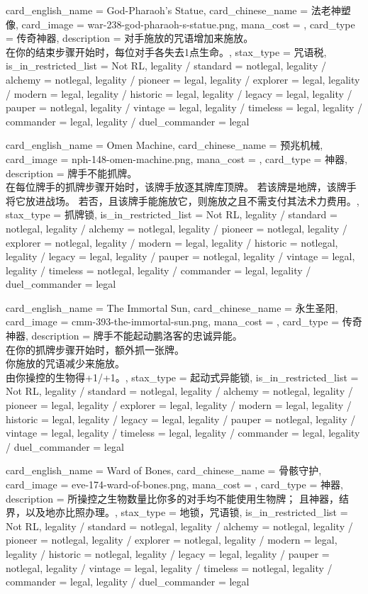 \documentclass[lang = cn, color = black, 10pt]{AllThatStax}
\begin{document}
\card
{
	card_english_name = {God-Pharaoh's Statue},
	card_chinese_name = {法老神塑像},
	card_image = war-238-god-pharaoh-s-statue.png,
	mana_cost = ,
	card_type = 传奇神器,
	description = {对手施放的咒语增加来施放。\\
在你的结束步骤开始时，每位对手各失去1点生命。},
	stax_type = 咒语税,
	is_in_restricted_list = Not RL,
	legality / standard = notlegal,
	legality / alchemy = notlegal,
	legality / pioneer = legal,
	legality / explorer = legal,
	legality / modern = legal,
	legality / historic = legal,
	legality / legacy = legal,
	legality / pauper = notlegal,
	legality / vintage = legal,
	legality / timeless = legal,
	legality / commander = legal,
	legality / duel_commander = legal
}

\card
{
	card_english_name = {Omen Machine},
	card_chinese_name = {预兆机械},
	card_image = nph-148-omen-machine.png,
	mana_cost = ,
	card_type = 神器,
	description = {牌手不能抓牌。\\
在每位牌手的抓牌步骤开始时，该牌手放逐其牌库顶牌。 若该牌是地牌，该牌手将它放进战场。 若否，且该牌手能施放它，则施放之且不需支付其法术力费用。},
	stax_type = 抓牌锁,
	is_in_restricted_list = Not RL,
	legality / standard = notlegal,
	legality / alchemy = notlegal,
	legality / pioneer = notlegal,
	legality / explorer = notlegal,
	legality / modern = legal,
	legality / historic = notlegal,
	legality / legacy = legal,
	legality / pauper = notlegal,
	legality / vintage = legal,
	legality / timeless = notlegal,
	legality / commander = legal,
	legality / duel_commander = legal
}

\card
{
	card_english_name = {The Immortal Sun},
	card_chinese_name = {永生圣阳},
	card_image = cmm-393-the-immortal-sun.png,
	mana_cost = ,
	card_type = 传奇神器,
	description = {牌手不能起动鹏洛客的忠诚异能。\\
在你的抓牌步骤开始时，额外抓一张牌。\\
你施放的咒语减少来施放。\\
由你操控的生物得+1/+1。},
	stax_type = 起动式异能锁,
	is_in_restricted_list = Not RL,
	legality / standard = notlegal,
	legality / alchemy = notlegal,
	legality / pioneer = legal,
	legality / explorer = legal,
	legality / modern = legal,
	legality / historic = legal,
	legality / legacy = legal,
	legality / pauper = notlegal,
	legality / vintage = legal,
	legality / timeless = legal,
	legality / commander = legal,
	legality / duel_commander = legal
}

\card
{
	card_english_name = {Ward of Bones},
	card_chinese_name = {骨骸守护},
	card_image = eve-174-ward-of-bones.png,
	mana_cost = ,
	card_type = 神器,
	description = {所操控之生物数量比你多的对手均不能使用生物牌； 且神器，结界，以及地亦比照办理。},
	stax_type = 地锁，咒语锁,
	is_in_restricted_list = Not RL,
	legality / standard = notlegal,
	legality / alchemy = notlegal,
	legality / pioneer = notlegal,
	legality / explorer = notlegal,
	legality / modern = legal,
	legality / historic = notlegal,
	legality / legacy = legal,
	legality / pauper = notlegal,
	legality / vintage = legal,
	legality / timeless = notlegal,
	legality / commander = legal,
	legality / duel_commander = legal
}
\end{document}
